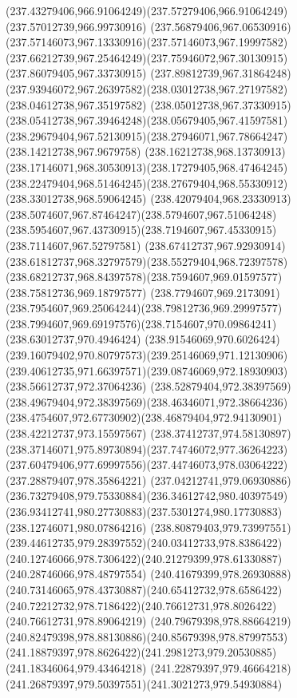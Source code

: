 {{		\curveto(237.43279406,966.91064249)(237.57279406,966.91064249)(237.57012739,966.99730916)
		\curveto(237.56879406,967.06530916)(237.57146073,967.13330916)(237.57146073,967.19997582)
		\curveto(237.66212739,967.25464249)(237.75946072,967.30130915)(237.86079405,967.33730915)
		\lineto(237.89812739,967.31864248)
		\curveto(237.93946072,967.26397582)(238.03012738,967.27197582)(238.04612738,967.35197582)
		\curveto(238.05012738,967.37330915)(238.05412738,967.39464248)(238.05679405,967.41597581)
		\curveto(238.29679404,967.52130915)(238.27946071,967.78664247)(238.14212738,967.9679758)
		\curveto(238.16212738,968.13730913)(238.17146071,968.30530913)(238.17279405,968.47464245)
		\curveto(238.22479404,968.51464245)(238.27679404,968.55330912)(238.33012738,968.59064245)
		\curveto(238.42079404,968.23330913)(238.5074607,967.87464247)(238.5794607,967.51064248)
		\curveto(238.5954607,967.43730915)(238.7194607,967.45330915)(238.7114607,967.52797581)
		\curveto(238.67412737,967.92930914)(238.61812737,968.32797579)(238.55279404,968.72397578)
		\curveto(238.68212737,968.84397578)(238.7594607,969.01597577)(238.75812736,969.18797577)
		\curveto(238.7794607,969.2173091)(238.7954607,969.25064244)(238.79812736,969.29997577)
		\curveto(238.7994607,969.69197576)(238.7154607,970.09864241)(238.63012737,970.4946424)
		\curveto(238.91546069,970.6026424)(239.16079402,970.80797573)(239.25146069,971.12130906)
		\curveto(239.40612735,971.66397571)(239.08746069,972.18930903)(238.56612737,972.37064236)
		\curveto(238.52879404,972.38397569)(238.49679404,972.38397569)(238.46346071,972.38664236)
		\curveto(238.4754607,972.67730902)(238.46879404,972.94130901)(238.42212737,973.15597567)
		\curveto(238.37412737,974.58130897)(238.37146071,975.89730894)(237.74746072,977.36264223)
		\curveto(237.60479406,977.69997556)(237.44746073,978.03064222)(237.28879407,978.35864221)
		\curveto(237.04212741,979.06930886)(236.73279408,979.75330884)(236.34612742,980.40397549)
		\curveto(236.93412741,980.27730883)(237.5301274,980.17730883)(238.12746071,980.07864216)
		\curveto(238.80879403,979.73997551)(239.44612735,979.28397552)(240.03412733,978.8386422)
		\curveto(240.12746066,978.7306422)(240.21279399,978.61330887)(240.28746066,978.48797554)
		\curveto(240.41679399,978.26930888)(240.73146065,978.43730887)(240.65412732,978.6586422)
		\curveto(240.72212732,978.7186422)(240.76612731,978.8026422)(240.76612731,978.89064219)
		\curveto(240.79679398,978.88664219)(240.82479398,978.88130886)(240.85679398,978.87997553)
		\curveto(241.18879397,978.8626422)(241.2981273,979.20530885)(241.18346064,979.43464218)
		\curveto(241.22879397,979.46664218)(241.26879397,979.50397551)(241.3021273,979.54930884)
}}

